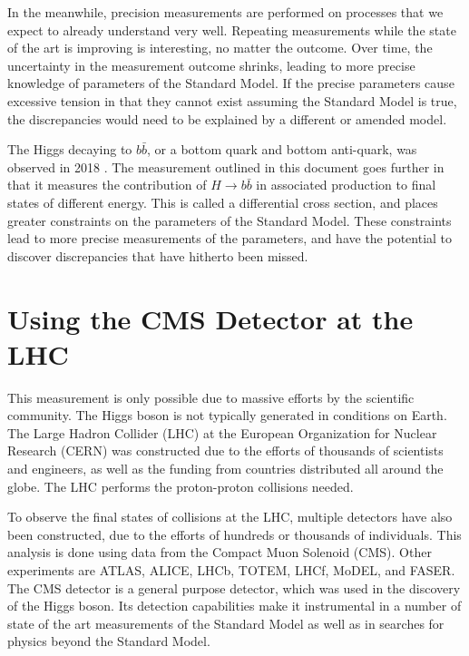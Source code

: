 In the meanwhile, precision measurements are performed on
processes that we expect to already understand very well.
Repeating measurements while the state of the art is improving is interesting,
no matter the outcome.
Over time, the uncertainty in the measurement outcome shrinks,
leading to more precise knowledge of parameters of the Standard Model.
If the precise parameters cause excessive tension in that they cannot exist
assuming the Standard Model is true,
the discrepancies would need to be explained by a different or amended model.

The Higgs decaying to $b\bar{b}$, or a bottom quark and bottom anti-quark,
was observed in 2018 \cite{obs-18, Aaboud_2018}.
The measurement outlined in this document goes further in that
it measures the contribution of $H \rightarrow b\bar{b}$ in associated production
to final states of different energy. 
This is called a differential cross section,
and places greater constraints on the parameters of the Standard Model.
These constraints lead to more precise measurements of the parameters,
and have the potential to discover discrepancies that have hitherto been missed.

\section{Using the CMS Detector at the LHC}

This measurement is only possible due to massive efforts by the scientific community.
The Higgs boson is not typically generated in conditions on Earth.
The Large Hadron Collider (LHC) at the European Organization for Nuclear Research (CERN)
was constructed due to the efforts of thousands of scientists and engineers,
as well as the funding from countries distributed all around the globe.
The LHC performs the proton-proton collisions needed.

To observe the final states of collisions at the LHC,
multiple detectors have also been constructed,
due to the efforts of hundreds or thousands of individuals.
This analysis is done using data from the Compact Muon Solenoid (CMS).
Other experiments are ATLAS, ALICE, LHCb, TOTEM, LHCf, MoDEL, and FASER.
The CMS detector is a general purpose detector,
which was used in the discovery of the Higgs boson.
Its detection capabilities make it instrumental in a number of state of the art
measurements of the Standard Model as well as in searches for
physics beyond the Standard Model.

